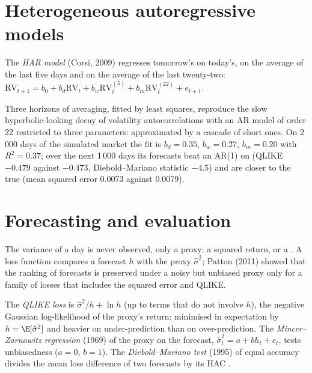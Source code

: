 \section{Heterogeneous autoregressive models}

\begin{definition}\label{def:qm:volatility-models:har}
The \emph{HAR model} (Corsi, 2009) regresses tomorrow's  on today's, on the average of the last five days and on the average of
the last twenty-two: $\mathrm{RV}_{t+1} = b_0 + b_d\mathrm{RV}_t + b_w\mathrm{RV}_t^{(5)} + b_m\mathrm{RV}_t^{(22)} + e_{t+1}$.
\end{definition}

Three horizons of averaging, fitted by least squares, reproduce the slow hyperbolic-looking decay of volatility autocorrelations with an AR model of order 22
restricted to three parameters:  approximated by a cascade of short ones. On 2\,000 days of the simulated market the fit is $b_d = 0.35$, $b_w =
0.27$, $b_m = 0.20$ with $R^2 = 0.37$; over the next 1\,000 days its forecasts beat an AR(1) on  (QLIKE $-0.479$ against $-0.473$,
Diebold--Mariano statistic $-4.5$) and are closer to the true  (mean squared error 0.0073 against 0.0079).

\section{Forecasting and evaluation}

The variance of a day is never observed, only a proxy: a squared return, or a . A loss function compares a forecast $h$ with the proxy
$\hat\sigma^2$; Patton (2011) showed that the ranking of forecasts is preserved under a noisy but unbiased proxy only for a family of losses that includes the
squared error and QLIKE.

\begin{definition}\label{def:qm:volatility-models:eval}
The \emph{QLIKE loss} is $\hat\sigma^2/h + \ln h$ (up to terms that do not involve $h$), the negative Gaussian log-likelihood of the proxy's
return: minimised in expectation by $h = \E[\hat\sigma^2]$ and heavier on under-prediction than on over-prediction. The \emph{Mincer--Zarnowitz
regression} (1969) of the proxy on the forecast, $\hat\sigma^2_t = a + bh_t + e_t$, tests unbiasedness ($a = 0$, $b = 1$). The
\emph{Diebold--Mariano test} (1995) of equal accuracy divides the mean loss difference of two forecasts by its HAC .
\end{definition}


